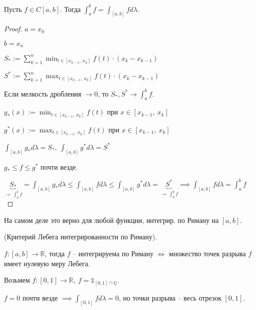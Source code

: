 \begin{theorem}
    Пусть $f \in C[a, b]$. Тогда $\int_a^b {f} = \int_{[a, b]}{f d \lambda}$.
\end{theorem}
\begin{proof}
    $a = x_0$

    $b = x_n$

    $S_* := \sum_{k=1}^{n} \min_{t \in [x_{k-1}, \ x_k]} {f(t) \cdot (x_k - x_{k-1})}$

    $S^* := \sum_{k=1}^{n} \max_{t \in [x_{k-1}, \ x_k]} {f(t) \cdot (x_k - x_{k-1})}$


    Если мелкость дробления $\rightarrow 0$, то $S_*, S^* \rightarrow \int_a^b {f}$.

    $g_*(x) := \min_{t \in [x_{k - 1}, \ x_k]}{f(t)}$ при $x \in [x_{k - 1}, \ x_k]$

    $g^*(x) := \max_{t \in [x_{k - 1}, \ x_k]}{f(t)}$ при $x \in [x_{k - 1}, \ x_k]$

    $\int_{[a, b]}{g_* d \lambda} = S_*, \ \int_{[a, b]}{g^* d \lambda} = S^*$

    $g_* \leq f \leq g^*$ почти везде.

    $\underbrace{S_*}_{\rightarrow \ \int_a^b f} = \int_{[a, b]}{g_* d \lambda} \leq \int_{[a, b]}{f d \lambda} \leq \int_{[a, b]}{g^* d \lambda} = \underbrace{S^*}_{\rightarrow \ \int_a^b{f}} \implies \int_{[a, b]}{f d \lambda} = \int_a^b {f}$
\end{proof}
\begin{remark}
    На самом деле это верно для любой функции, интегрир. по Риману на $[a, b]$.
\end{remark}

\begin{theorem}
    (Критерий Лебега интегрированности по Риману).

    $f: [a, b] \rightarrow \mathbb{R}$, тогда $f$ -- интегрируема по Риману $\Leftrightarrow$ множество точек разрыва $f$ имеет нулевую меру Лебега.
\end{theorem}
\begin{example}
    Возьмем $f: [0, 1] \rightarrow \mathbb{R}, \ f = \mathds{1}_{[0, 1] \cap \mathbb{Q}}$.

    $f = 0$ почти везде $\implies \int_{[0, 1]}{f d \lambda} = 0$, но точки разрыва -- весь отрезок $[0, 1]$.
\end{example}

